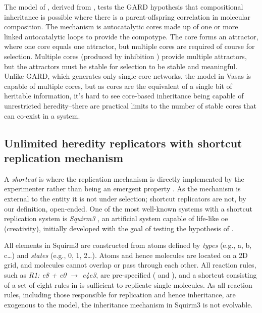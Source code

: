 
The model of \cite{Vasas2015, Vasas2012, Vasas2012a}, derived from \cite{Farmer1986}, tests the GARD hypothesis that compositional inheritance is possible where there is a parent-offspring correlation in molecular composition. The mechanism is autocatalytic cores made up of one or more linked autocatalytic loops to provide the compotype. The core forms an attractor, where one core equals one attractor, but multiple cores are required of course for selection. Multiple cores (produced by inhibition \textcite{Vasas2012a}) provide multiple attractors, but the attractors must be stable for selection to be stable and meaningful. Unlike GARD, which generates only single-core networks, the model in Vasas is capable of multiple cores, but as cores are the equivalent of a single bit of heritable information, it's hard to see core-based inheritance being capable of unrestricted heredity--there are practical limits to the number of stable cores that can co-exist in a system. 

\subsection{Unlimited heredity replicators with shortcut replication mechanism}

A \emph{shortcut} is where the replication mechanism is directly implemented by the experimenter rather than being an emergent property \parencite{BanzhafBaumgaertnerBeslonEtAl2016}. As the mechanism is external to the entity it is not under selection; shortcut replicators are not, by our definition, open-ended. One of the most well-known systems with a shortcut replication system is \emph{Squirm3} \parencite{Hutton2007,Hutton2002}, an artificial system capable of life-like \gls{oe} (creativity), initially developed with the goal of testing the hypothesis of \textcite{Taylor2001} \parencite[p.341]{Hutton2002}.

All elements in Squirm3 are constructed from atoms defined by \emph{types} (e.g., a, b, c\dots) and \emph{states} (e.g., 0, 1, 2\dots). Atoms and hence molecules are located on a 2D grid, and molecules cannot overlap or pass through each other. All reaction rules, such as \emph{R1: e8 + e0 $\rightarrow$ e4e3}, are pre-specified (\textcite[p.4]{Hutton2007} and \textcite[p.49]{Faulconbridge2011}), and a shortcut consisting of a set of eight rules in \textcite{Hutton2002} is sufficient to replicate single molecules. As all reaction rules, including those responsible for replication and hence inheritance, are exogenous to the model, the inheritance mechanism in Squirm3 is not evolvable. 

